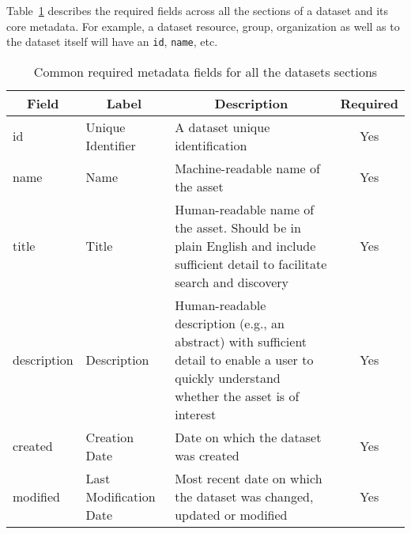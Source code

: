 Table~\ref{table:common_sections_metadata} describes the required fields across all the sections of a dataset and its core metadata. For example, a dataset resource, group, organization as well as to the dataset itself will have an \texttt{id}, \texttt{name}, etc.

\begin{table}[ht!]
\centering
\begin{adjustwidth}{-.5in}{-.5in}
\small
\begin{tabular}{|l|p{2cm}|p{9cm}|c|}
\hline
\multicolumn{1}{|c|}{{\bf Field}} & \multicolumn{1}{c|}{{\bf Label}} & \multicolumn{1}{c|}{{\bf Description}}                                                                                                        & {\bf Required} \\ \hline
id                                & Unique Identifier                & A dataset unique identification                                                                                                               & Yes            \\ \hline
name                              & Name                             & Machine-readable name of the asset                                                                                                            & Yes            \\ \hline
title                             & Title                            & Human-readable name of the asset. Should be in plain English and include sufficient detail to facilitate search and discovery                 & Yes            \\ \hline
description                       & Description                      & Human-readable description (e.g., an abstract) with sufficient detail to enable a user to quickly understand whether the asset is of interest & Yes            \\ \hline
created                           & Creation Date                    & Date on which the dataset was created                                                                                                         & Yes            \\ \hline
modified                          & Last Modification Date           & Most recent date on which the dataset was changed, updated or modified                                                                        & Yes            \\ \hline
\end{tabular}
\caption{Common required metadata fields for all the datasets sections}
\label{table:common_sections_metadata}
\end{adjustwidth}
\end{table}

